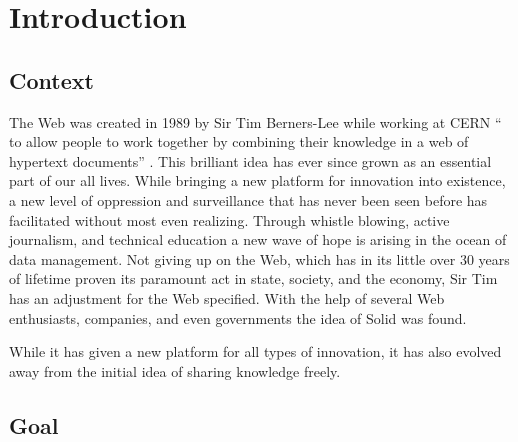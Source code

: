 \chapter{Introduction}
\section{Context}

The Web was created in 1989 by Sir Tim Berners-Lee while working at CERN “\textelp{} to allow people to work together by combining their knowledge in a web of hypertext documents” \cite{timbl-bio}. This brilliant idea has ever since grown as an essential part of our all lives. While bringing a new platform for innovation into existence, a new level of oppression and surveillance that has never been seen before has facilitated without most even realizing. Through whistle blowing, active journalism, and technical education a new wave of hope is arising in the ocean of data management. Not giving up on the Web, which has in its little over 30 years of lifetime proven its paramount act in state, society, and the economy, Sir Tim has an adjustment for the Web specified. With the help of several Web enthusiasts, companies, and even governments the idea of Solid was found.


While it has given a new platform for all types of innovation, it has also evolved away from the initial idea of sharing knowledge freely.

\section{Goal}
